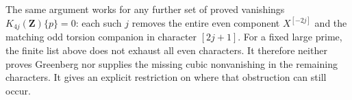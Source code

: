 The same argument works for any further set of proved vanishings
$K_{4j}(\mathbf Z)\{p\}=0$: each such $j$ removes the entire
even component $X^{[-2j]}$ and the matching odd torsion companion
in character $[2j+1]$. For a fixed large prime, the finite list
above does not exhaust all even characters. It therefore neither
proves Greenberg nor supplies the missing cubic nonvanishing in
the remaining characters. It gives an explicit restriction on
where that obstruction can still occur.

